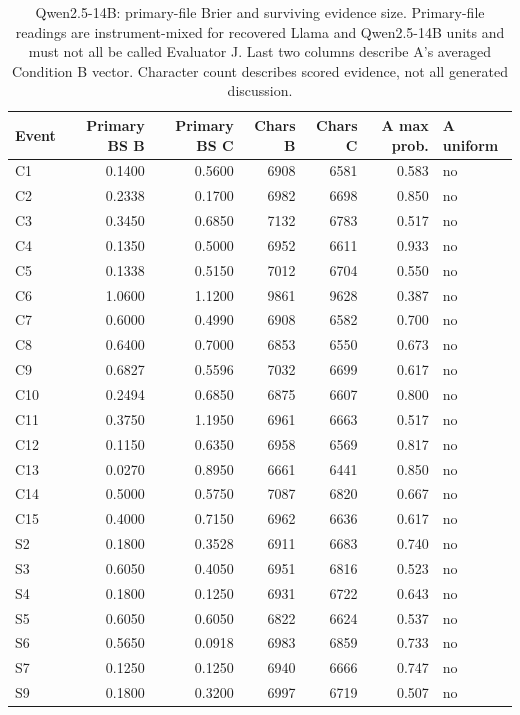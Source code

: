 \begin{table}[!htbp]
\centering\small
\caption{Qwen2.5-14B: primary-file Brier and surviving evidence size. Primary-file readings are instrument-mixed for recovered Llama and Qwen2.5-14B units and must not all be called Evaluator J. Last two columns describe A's averaged Condition B vector. Character count describes scored evidence, not all generated discussion.}
\label{tab:full_primary_qwen2514b}
\begin{tabular}{lrrrrrl}
\toprule
Event & Primary BS B & Primary BS C & Chars B & Chars C & A max prob. & A uniform \\
\midrule
C1 & 0.1400 & 0.5600 & 6908 & 6581 & 0.583 & no \\
C2 & 0.2338 & 0.1700 & 6982 & 6698 & 0.850 & no \\
C3 & 0.3450 & 0.6850 & 7132 & 6783 & 0.517 & no \\
C4 & 0.1350 & 0.5000 & 6952 & 6611 & 0.933 & no \\
C5 & 0.1338 & 0.5150 & 7012 & 6704 & 0.550 & no \\
C6 & 1.0600 & 1.1200 & 9861 & 9628 & 0.387 & no \\
C7 & 0.6000 & 0.4990 & 6908 & 6582 & 0.700 & no \\
C8 & 0.6400 & 0.7000 & 6853 & 6550 & 0.673 & no \\
C9 & 0.6827 & 0.5596 & 7032 & 6699 & 0.617 & no \\
C10 & 0.2494 & 0.6850 & 6875 & 6607 & 0.800 & no \\
C11 & 0.3750 & 1.1950 & 6961 & 6663 & 0.517 & no \\
C12 & 0.1150 & 0.6350 & 6958 & 6569 & 0.817 & no \\
C13 & 0.0270 & 0.8950 & 6661 & 6441 & 0.850 & no \\
C14 & 0.5000 & 0.5750 & 7087 & 6820 & 0.667 & no \\
C15 & 0.4000 & 0.7150 & 6962 & 6636 & 0.617 & no \\
S2 & 0.1800 & 0.3528 & 6911 & 6683 & 0.740 & no \\
S3 & 0.6050 & 0.4050 & 6951 & 6816 & 0.523 & no \\
S4 & 0.1800 & 0.1250 & 6931 & 6722 & 0.643 & no \\
S5 & 0.6050 & 0.6050 & 6822 & 6624 & 0.537 & no \\
S6 & 0.5650 & 0.0918 & 6983 & 6859 & 0.733 & no \\
S7 & 0.1250 & 0.1250 & 6940 & 6666 & 0.747 & no \\
S9 & 0.1800 & 0.3200 & 6997 & 6719 & 0.507 & no \\

\end{tabular}
\end{table}
